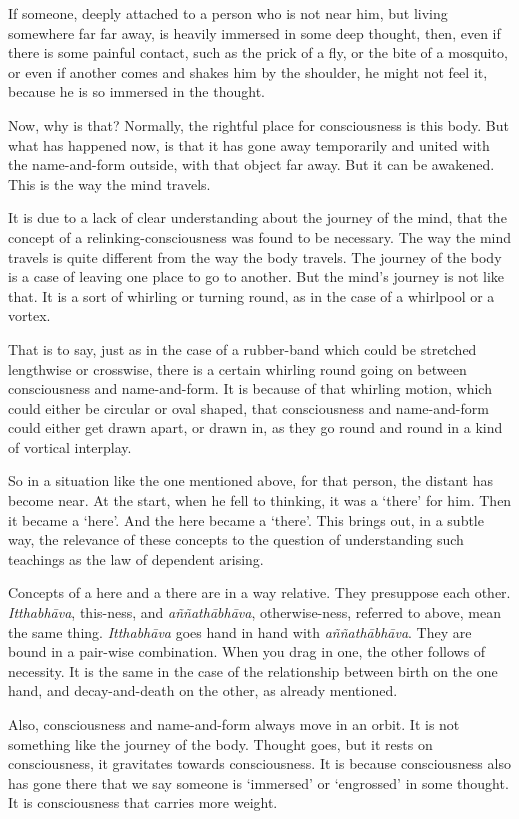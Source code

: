 If someone, deeply attached to a person who is not near him, but living somewhere far far away, is heavily immersed in some deep thought, then, even if there is some painful contact, such as the prick of a fly, or the bite of a mosquito, or even if another comes and shakes him by the shoulder, he might not feel it, because he is so immersed in the thought.

Now, why is that? Normally, the rightful place for consciousness is this body. But what has happened now, is that it has gone away temporarily and united with the name-and-form outside, with that object far away. But it can be awakened. This is the way the mind travels.

It is due to a lack of clear understanding about the journey of the mind, that the concept of a relinking-consciousness was found to be necessary. The way the mind travels is quite different from the way the body travels. The journey of the body is a case of leaving one place to go to another. But the mind's journey is not like that. It is a sort of whirling or turning round, as in the case of a whirlpool or a vortex.

That is to say, just as in the case of a rubber-band which could be stretched lengthwise or crosswise, there is a certain whirling round going on between consciousness and name-and-form. It is because of that whirling motion, which could either be circular or oval shaped, that consciousness and name-and-form could either get drawn apart, or drawn in, as they go round and round in a kind of vortical interplay.

So in a situation like the one mentioned above, for that person, the distant has become near. At the start, when he fell to thinking, it was a `there' for him. Then it became a `here'. And the here became a `there'. This brings out, in a subtle way, the relevance of these concepts to the question of understanding such teachings as the law of dependent arising.

Concepts of a here and a there are in a way relative. They presuppose each other. \emph{Itthabhāva}, this-ness, and \emph{aññathābhāva}, otherwise-ness, referred to above, mean the same thing. \emph{Itthabhāva} goes hand in hand with \emph{aññathābhāva}. They are bound in a pair-wise combination. When you drag in one, the other follows of necessity. It is the same in the case of the relationship between birth on the one hand, and decay-and-death on the other, as already mentioned.

Also, consciousness and name-and-form always move in an orbit. It is not something like the journey of the body. Thought goes, but it rests on consciousness, it gravitates towards consciousness. It is because consciousness also has gone there that we say someone is `immersed' or `engrossed' in some thought. It is consciousness that carries more weight.

